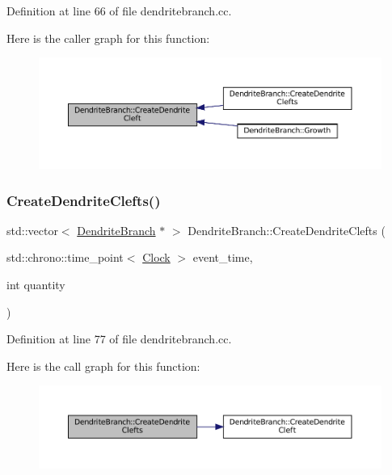 Definition at line 66 of file dendritebranch.\+cc.

Here is the caller graph for this function\+:\nopagebreak
\begin{figure}[H]
\begin{center}
\leavevmode
\includegraphics[width=350pt]{class_dendrite_branch_a4f751442a537f2e3d7d0dc66a09bd84b_icgraph}
\end{center}
\end{figure}
\mbox{\label{class_dendrite_branch_a86d00d6ad66c8c83683e9e22d73a71b6}} 
\subsubsection{\texorpdfstring{Create\+Dendrite\+Clefts()}{CreateDendriteClefts()}}
{\footnotesize\ttfamily std\+::vector$<$ \mbox{\hyperlink{class_dendrite_branch}{Dendrite\+Branch}} $\ast$ $>$ Dendrite\+Branch\+::\+Create\+Dendrite\+Clefts (\begin{DoxyParamCaption}\item[{std\+::chrono\+::time\+\_\+point$<$ \mbox{\hyperlink{universe_8h_a0ef8d951d1ca5ab3cfaf7ab4c7a6fd80}{Clock}} $>$}]{event\+\_\+time,  }\item[{int}]{quantity }\end{DoxyParamCaption})}



Definition at line 77 of file dendritebranch.\+cc.

Here is the call graph for this function\+:\nopagebreak
\begin{figure}[H]
\begin{center}
\leavevmode
\includegraphics[width=350pt]{class_dendrite_branch_a86d00d6ad66c8c83683e9e22d73a71b6_cgraph}
\end{center}
\end{figure}
\mbox{\label{class_dendrite_branch_a60225ab106eae6bce25eb8159166d5e9}} 
